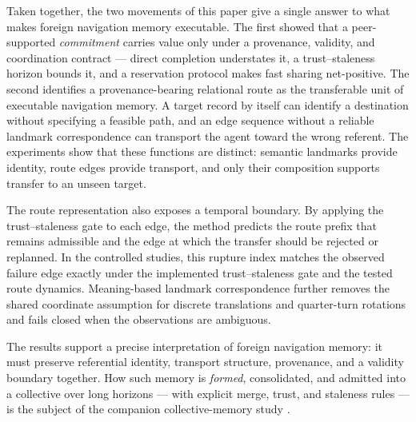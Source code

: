 \documentclass{article}
\begin{document}
Taken together, the two movements of this paper give a single answer to
what makes foreign navigation memory executable. The first showed that a
peer-supported \emph{commitment} carries value only under a provenance,
validity, and coordination contract --- direct completion understates
it, a trust--staleness horizon bounds it, and a reservation protocol
makes fast sharing net-positive. The second identifies a
provenance-bearing relational route as the
transferable unit of executable navigation memory. A target record by
itself can identify a destination without specifying a feasible path,
and an edge sequence without a reliable landmark correspondence can
transport the agent toward the wrong referent. The experiments show
that these functions are distinct: semantic landmarks provide
identity, route edges provide transport, and only their composition
supports transfer to an unseen target.

The route representation also exposes a temporal boundary. By
applying the trust--staleness gate to each edge, the method predicts
the route prefix that remains admissible and the edge at which the
transfer should be rejected or replanned. In the controlled studies,
this rupture index matches the observed failure edge exactly under the
implemented trust--staleness gate and the tested route dynamics.
Meaning-based landmark correspondence further removes the shared
coordinate assumption for discrete translations and quarter-turn
rotations and fails closed when the observations are ambiguous.

The results support a precise interpretation of foreign navigation
memory: it must preserve referential identity, transport structure,
provenance, and a validity boundary together. How such memory is
\emph{formed}, consolidated, and admitted into a collective over long
horizons --- with explicit merge, trust, and staleness rules --- is the
subject of the companion collective-memory study \citep{songlines3}.


\clearpage
\appendix
\end{document}

